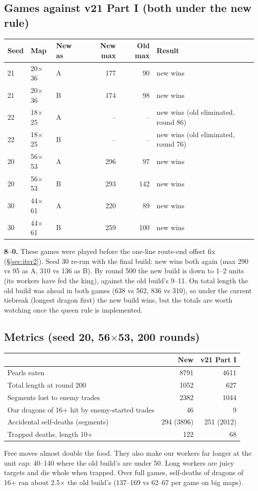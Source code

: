 \documentclass[11pt,a4paper]{article}
\begin{document}
\subsection{Games against v21 Part I (both under the new rule)}
\begin{center}
\begin{tabular}{@{}lllrrl@{}}
\toprule
Seed & Map & New as & New max & Old max & Result \\
\midrule
21 & 20$\times$36 & A & 177 & 90 & new wins \\
21 & 20$\times$36 & B & 174 & 98 & new wins \\
22 & 18$\times$25 & A & -- & -- & new wins (old eliminated, round 86) \\
22 & 18$\times$25 & B & -- & -- & new wins (old eliminated, round 76) \\
20 & 56$\times$53 & A & 296 & 97 & new wins \\
20 & 56$\times$53 & B & 293 & 142 & new wins \\
30 & 44$\times$61 & A & 220 & 89 & new wins \\
30 & 44$\times$61 & B & 259 & 100 & new wins \\
\bottomrule
\end{tabular}
\end{center}
\textbf{8--0.} These games were played before the one-line route-end offset fix (\S\ref{sec:iter2}). Seed 30 re-run with the final
build: new wins both again (max 290 vs 95 as A, 310 vs 136 as B). By round 500 the new build is down to 1--2 units (its workers
have fed the king), against the old build's 9--11. On total length the old build was ahead in both games (638 vs 562, 836 vs 310), so
under the current tiebreak (longest dragon first) the new build wins, but the totals are worth watching once the queen rule
is implemented.

\subsection{Metrics (seed 20, 56$\times$53, 200 rounds)}
\begin{center}
\begin{tabular}{@{}lrr@{}}
\toprule
 & New & v21 Part I \\
\midrule
Pearls eaten & 8791 & 4611 \\
Total length at round 200 & 1052 & 627 \\
Segments lost to enemy trades & 2382 & 1044 \\
Our dragons of 16+ hit by enemy-started trades & 46 & 9 \\
Accidental self-deaths (segments) & 294 (3896) & 251 (2012) \\
Trapped deaths, length 10+ & 122 & 68 \\
\bottomrule
\end{tabular}
\end{center}
Free moves almost double the food. They also make our workers far longer at the unit cap: 40--140 where the old build's are
under 50. Long workers are juicy targets and die whole when trapped. Over full games, self-deaths of dragons of 16+ ran about
2.5$\times$ the old build's (137--169 vs 62--67 per game on big maps).
\end{document}
